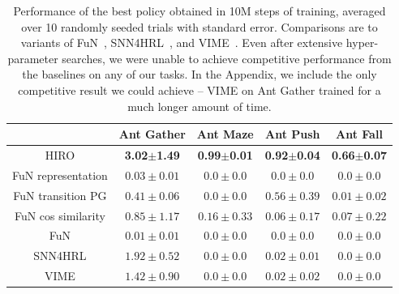 \documentclass{article}
\begin{document}

\begin{table}[t]
    \begin{center}
    \begin{tabular}{ c | c | c | c | c |}
        & {\bf Ant Gather} & {\bf Ant Maze} &
        {\bf Ant Push} & {\bf Ant Fall} \\
        \hline
        HIRO & {\bf 3.02}$\pm${\bf 1.49} & {\bf 0.99}$\pm${\bf 0.01} & {\bf 0.92}$\pm${\bf 0.04} & {\bf 0.66}$\pm${\bf 0.07} \\
        FuN representation & $0.03\pm 0.01$ & $0.0\pm 0.0$ & $0.0\pm 0.0$ &  $0.0\pm 0.0$ \\
        FuN transition PG & $0.41\pm 0.06$ & $0.0\pm 0.0$ & $0.56\pm 0.39$ & $0.01\pm 0.02$ \\
        FuN cos similarity & $0.85\pm 1.17$ & $0.16\pm 0.33$ & $0.06\pm 0.17$ & $0.07\pm 0.22$ \\
        FuN & $0.01\pm 0.01$ & $0.0\pm 0.0$ & $0.0\pm 0.0$ & $0.0\pm 0.0$ \\
        SNN4HRL & $1.92\pm 0.52$ & $0.0\pm 0.0$ & $0.02\pm 0.01$ & $0.0\pm 0.0$ \\
        VIME & $1.42\pm 0.90$ & $0.0\pm 0.0$ & $0.02\pm 0.02$ & $0.0\pm 0.0$ \\
        \hline
    \end{tabular}
    \end{center}
\caption{Performance of the best policy obtained in 10M steps of training, averaged over 10 randomly seeded trials with standard error.  Comparisons are to variants of FuN~\cite{vezhnevets2017feudal}, SNN4HRL~\cite{florensa2017stochastic}, and VIME~\cite{houthooft2016vime}. Even after extensive hyper-parameter searches, we were unable to achieve competitive performance from the baselines on any of our tasks.  In the Appendix, we include the only competitive result we could achieve -- VIME on Ant Gather trained for a much longer amount of time.
}
\label{tab:comparisons}
\end{table}
\end{document}
